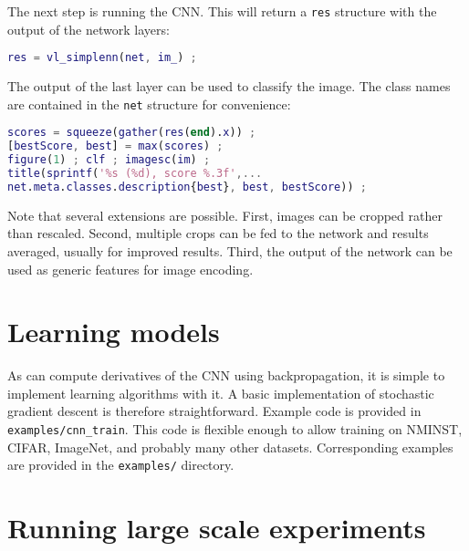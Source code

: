 The next step is running the CNN. This will return a \verb!res! structure with the output of the network layers:
\begin{lstlisting}[language=Matlab]
% run the CNN
res = vl_simplenn(net, im_) ;
\end{lstlisting}

The output of the last layer can be used to classify the image. The class names are contained in the \verb!net! structure for convenience:
\begin{lstlisting}[language=Matlab]
% show the classification result
scores = squeeze(gather(res(end).x)) ;
[bestScore, best] = max(scores) ;
figure(1) ; clf ; imagesc(im) ;
title(sprintf('%s (%d), score %.3f',...
net.meta.classes.description{best}, best, bestScore)) ;
\end{lstlisting}

Note that several extensions are possible. First, images can be cropped rather than rescaled. Second, multiple crops can be fed to the network and results averaged, usually for improved results. Third, the output of the network can be used as generic features for image encoding.

\section{Learning models}\label{s:wrappers-learning}

As \matconvnet can compute derivatives of the CNN using backpropagation, it is simple to implement learning algorithms with it. A basic implementation of stochastic gradient descent is therefore straightforward. Example code is provided in \verb!examples/cnn_train!. This code is flexible enough to allow training on NMINST, CIFAR, ImageNet, and probably many other datasets. Corresponding examples are provided in the \verb!examples/! directory.

\section{Running large scale experiments}

